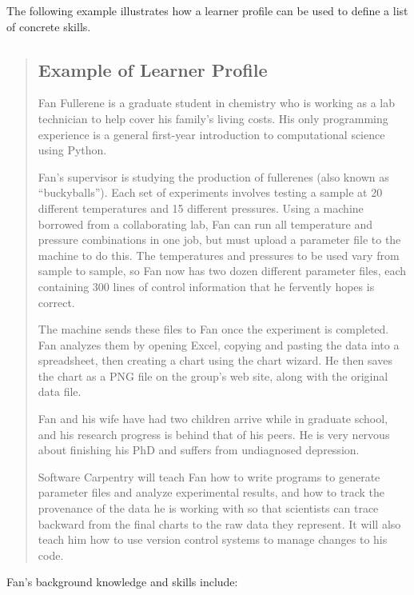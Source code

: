 \documentclass[]{book}
\begin{document}
The following example illustrates how a learner profile can be used to define a list of
concrete skills.

\begin{quote}
\hypertarget{example-of-learner-profile}{%
\subsection*{Example of Learner Profile}\label{example-of-learner-profile}}

Fan Fullerene is a graduate student in chemistry who is working as a lab
technician to help cover his family's living costs. His only programming
experience is a general first-year introduction to computational science using
Python.

Fan's supervisor is studying the production of fullerenes (also known as
``buckyballs''). Each set of experiments involves testing a sample at 20
different temperatures and 15 different pressures. Using a machine borrowed
from a collaborating lab, Fan can run all temperature and pressure
combinations in one job, but must upload a parameter file to the machine to do
this. The temperatures and pressures to be used vary from sample to sample, so
Fan now has two dozen different parameter files, each containing 300 lines of
control information that he fervently hopes is correct.

The machine sends these files to Fan once the experiment is completed. Fan
analyzes them by opening Excel, copying and pasting the data into a
spreadsheet, then creating a chart using the chart wizard. He then saves the
chart as a PNG file on the group's web site, along with the original data
file.

Fan and his wife have had two children arrive while in graduate school, and
his research progress is behind that of his peers. He is very nervous about
finishing his PhD and suffers from undiagnosed depression.

Software Carpentry will teach Fan how to write programs to generate parameter
files and analyze experimental results, and how to track the provenance of the
data he is working with so that scientists can trace backward from the final
charts to the raw data they represent. It will also teach him how to use
version control systems to manage changes to his code.
\end{quote}

Fan's background knowledge and skills include:
\end{document}
